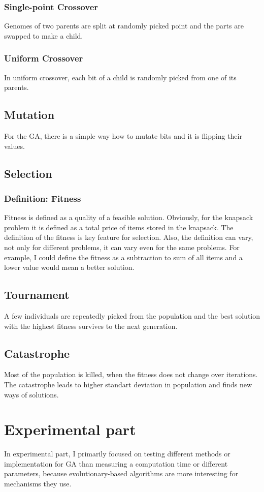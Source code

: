 \documentclass{article}
\begin{document}
		\subsubsection{Single-point Crossover}
		Genomes of two parents are split at randomly picked point and the parts are swapped to make a child.
		\subsubsection{Uniform Crossover}
		In uniform crossover, each bit of a child is randomly picked from one of its parents.
	\subsection{Mutation}
		For the GA, there is a simple way how to mutate bits and it is flipping their values.
	\subsection{Selection}
		\subsubsection{Definition: Fitness}
		Fitness is defined as a quality of a feasible solution. Obviously, for the knapsack problem it is defined as a total price of items stored in the knapsack. The definition of the fitness is key feature for selection. Also, the definition can vary, not only for different problems, it can vary even for the same problems. For example, I could define the fitness as a subtraction to sum of all items and a lower value would mean a better solution.
		\subsection{Tournament}
		A few individuals are repeatedly picked from the population and the best solution with the highest fitness survives to the next generation.
		\subsection{Catastrophe}
		Most of the population is killed, when the fitness does not change over iterations. The catastrophe leads to higher standart deviation in population and finds new ways of solutions.

\section{Experimental part}
	In experimental part, I primarily focused on testing different methods or implementation for GA than measuring a computation time or different parameters, because evolutionary-based algorithms are more interesting for mechanisms they use.
	
\end{document}
